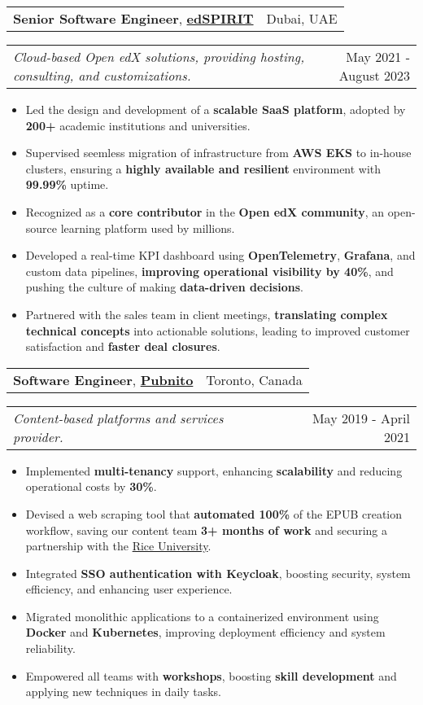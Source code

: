 \documentclass[letterpaper,11pt]{article}
\makeatletter
\newcommand{\resumeItemSimple}[1]{
  \item\small{
    {#1}
  }
}
\newcommand{\resumeSubheadingSimple}[5]{
    \begin{tabular*}{1\textwidth}[t]{l@{\extracolsep{\fill}}r}
      \textbf{#1}, \textbf{\href{#3}{#2}} \space \small#4 & \small#5 \\
    \end{tabular*}
}
\newcommand{\resumeSubSubheading}[2]{
    \begin{tabular*}{1\textwidth}{l@{\extracolsep{\fill}}r}
      \textit{\small#1} & \small #2 \\
    \end{tabular*}\vspace{-1pt}
}
\newcommand{\resumeItemListStart}{\begin{itemize}[leftmargin=0.5cm, itemsep=1pt, parsep=0pt]} %
\newcommand{\resumeItemListEnd}{\end{itemize}}
\makeatother
\begin{document}
      \resumeSubheadingSimple
        {Senior Software Engineer}{edSPIRIT}{https://www.linkedin.com/company/edspirit-tech/}{}{Dubai, UAE}
        \resumeSubSubheading{Cloud-based Open edX solutions, providing hosting, consulting, and customizations.}{May 2021 - August 2023}
        \resumeItemListStart
          \resumeItemSimple{Led the design and development of a \textbf{scalable SaaS platform}, adopted by \textbf{200+} academic institutions and universities.}
          \resumeItemSimple{Supervised seemless migration of infrastructure from \textbf{AWS EKS} to in-house clusters, ensuring a \textbf{highly available and resilient} environment with \textbf{99.99\%} uptime.}
          \resumeItemSimple{Recognized as a \textbf{core contributor} in the \textbf{Open edX community}, an open-source learning platform used by millions.}
          \resumeItemSimple{Developed a real-time KPI dashboard using \textbf{OpenTelemetry}, \textbf{Grafana}, and custom data pipelines, \textbf{improving operational visibility by 40\%}, and pushing the culture of making \textbf{data-driven decisions}.}
          \resumeItemSimple{Partnered with the sales team in client meetings, \textbf{translating complex technical concepts} into actionable solutions, leading to improved customer satisfaction and \textbf{faster deal closures}.}
        \resumeItemListEnd

      \resumeSubheadingSimple
        {Software Engineer}{Pubnito}{https://www.linkedin.com/company/pubnito/}{}{Toronto, Canada}
        \resumeSubSubheading{Content-based platforms and services provider.}{May 2019 - April 2021}
        \resumeItemListStart
          \resumeItemSimple{Implemented \textbf{multi-tenancy} support, enhancing \textbf{scalability} and reducing operational costs by \textbf{30\%}.}
          \resumeItemSimple{Devised a web scraping tool that \textbf{automated 100\%} of the EPUB creation workflow, saving our content team \textbf{3+ months of work} and securing a partnership with the \href{https://www.rice.edu/}{Rice University}.}
          \resumeItemSimple{Integrated \textbf{SSO authentication with Keycloak}, boosting security, system efficiency, and enhancing user experience.}
          \resumeItemSimple{Migrated monolithic applications to a containerized environment using \textbf{Docker} and \textbf{Kubernetes}, improving deployment efficiency and system reliability.}
          \resumeItemSimple{Empowered all teams with \textbf{workshops}, boosting \textbf{skill development} and applying new techniques in daily tasks.}
        \resumeItemListEnd
\end{document}

